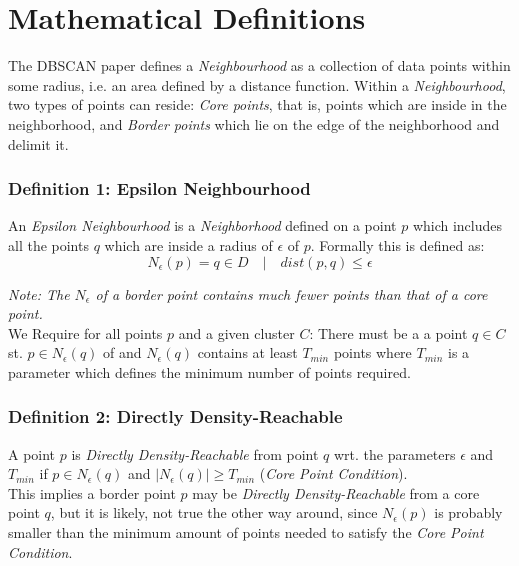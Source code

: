 \section{Mathematical Definitions}

The DBSCAN paper defines a \textit{Neighbourhood} as a collection of data points within some radius, i.e. an area defined by a distance function. Within a \textit{Neighbourhood}, two types of points can reside: \textit{Core points}, that is, points which are inside in the neighborhood, and \textit{Border points } which lie on the edge of the neighborhood and delimit it. 

\subsubsection*{Definition 1: Epsilon Neighbourhood}
An \textit{Epsilon Neighbourhood} is a \textit{Neighborhood} defined on a point $p$ which includes all the points $q$ which are inside a radius of $\epsilon$ of $p$. Formally this is defined as:\\

\begin{equation}
\label{eq:epsilon-nbh}
    N_{\epsilon} (p) = q \in D \quad|\quad dist(p,q) \leq \epsilon
\end{equation}

\textit{Note: The $N_{\epsilon}$ of a border point contains much fewer points than that of a core point. }\\

We Require for all points $p$ and a given cluster $C$: There must be a a point $q \in C$ st. $p \in N_{\epsilon}(q)$ of and $N_{\epsilon}(q)$ contains at least $T_{min}$ points where $T_{min}$ is a parameter which defines the minimum number of points required.

\subsubsection*{Definition 2: Directly Density-Reachable}
A point $p$ is \textit{Directly Density-Reachable} from point $q$ wrt. the parameters $\epsilon$ and $T_{min}$ if $p \in N_{\epsilon}(q)$ and $|N_{\epsilon}(q)| \geq T_{min}$ (\textit{Core Point Condition}).\\

This implies a border point $p$ may be \textit{Directly Density-Reachable} from a core point $q$, but it is likely, not true the other way around, since $N_{\epsilon}(p)$ is probably smaller than the minimum amount of points needed to satisfy the \textit{Core Point Condition}.

